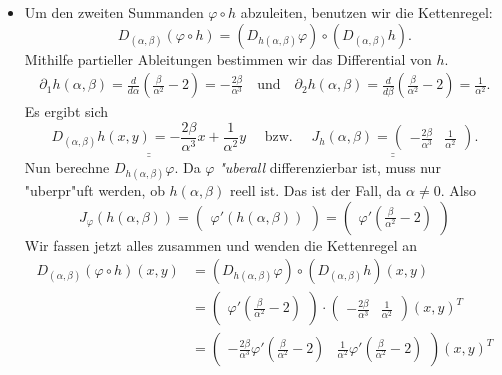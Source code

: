 \documentclass{article}
\def\doubleunderline#1{\underline{\underline{#1}}}
\begin{document}
\begin{enumerate}[label=(\roman*)]
\begin{itemize}
        
        
        \item  Um den zweiten Summanden $\varphi \circ h$ abzuleiten, benutzen wir die Kettenregel:
        \[
            D_{(\alpha,\beta)}(\varphi \circ h) = (D_{h(\alpha,\beta)}\varphi) \circ (D_{(\alpha,\beta)}h).
        \]
        Mithilfe partieller Ableitungen bestimmen wir das Differential von $h$.
        \begin{align*}
            \partial_1h(\alpha,\beta) 
            = \frac{d}{d\alpha}\left (\frac{\beta}{\alpha^2}-2 \right)
            = -\frac{2\beta}{\alpha^3} \quad \text{und} \quad 
            \partial_2h(\alpha,\beta)
            = \frac{d}{d\beta}\left (\frac{\beta}{\alpha^2}-2 \right)
            = \frac{1}{\alpha^2}.
        \end{align*}
        Es ergibt sich 
        \[
            \doubleunderline {D_{(\alpha,\beta)}h(x,y) = -\frac{2\beta}{\alpha^3}x + \frac{1}{\alpha^2}y} \quad \text{ bzw. } \quad \doubleunderline{ J_h(\alpha,\beta) = \begin{pmatrix}-\frac{2\beta}{\alpha^3} & \frac{1}{\alpha^2}\end{pmatrix} }.
        \]
        Nun berechne $D_{h(\alpha,\beta)}\varphi$. Da $\varphi$ \textit{"uberall} differenzierbar ist, muss nur "uberpr"uft werden, ob $h(\alpha,\beta)$ reell ist. Das ist der Fall, da $\alpha \neq 0$. Also 
        \[
            J_\varphi(h(\alpha,\beta)) = \begin{pmatrix} \varphi'(h(\alpha,\beta)) \end{pmatrix} = \begin{pmatrix} \varphi'(\frac{\beta}{\alpha^2}-2) \end{pmatrix}
        \]
        Wir fassen jetzt alles zusammen und wenden die Kettenregel an
        \begin{align*}
            D_{(\alpha,\beta)}(\varphi \circ h) (x,y)
            &= (D_{h(\alpha,\beta)}\varphi) \circ (D_{(\alpha,\beta)}h)(x,y)  \\
            &= \begin{pmatrix} \varphi'(\frac{\beta}{\alpha^2}-2) \end{pmatrix} \cdot \begin{pmatrix}-\frac{2\beta}{\alpha^3} & \frac{1}{\alpha^2}\end{pmatrix} (x,y)^T \\[4pt]
            &= \begin{pmatrix} -\frac{2\beta}{\alpha^3} \varphi'(\frac{\beta}{\alpha^2}-2) & \frac{1}{\alpha^2} \varphi'(\frac{\beta}{\alpha^2}-2) \end{pmatrix} (x,y)^T\\[4pt]

\end{align*}
\end{itemize}
\end{enumerate}
\end{document}
